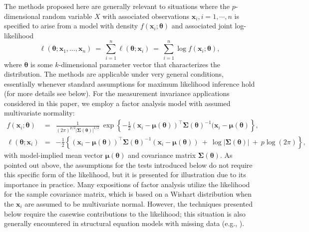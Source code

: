 \documentclass[man]{apa}
\begin{document}
The methods proposed here are generally relevant to situations where the
$p$-dimensional random variable $X$ with associated observations $\bm{x}_i, i=1,\cdots,n$
is specified to arise from a model with density $f(\bm{x}_i; \bm{\theta})$ and
associated joint log-likelihood
\begin{equation} \label{eq:loglik}
  \ell(\bm{\theta}; \bm{x}_1, \dots, \bm{x}_n) ~=~
    \sum_{i = 1}^n \ell(\bm{\theta}; \bm{x}_i) ~=~
    \sum_{i = 1}^n  \log f(\bm{x}_i; \bm{\theta}),
\end{equation}
where ${\bm \theta}$ is some $k$-dimensional parameter vector that characterizes
the distribution. 
The methods are applicable under very general conditions, essentially
whenever standard assumptions for maximum likelihood inference hold (for more
details see below). For the measurement invariance applications
considered in this paper, we employ
a factor analysis model with assumed multivariate normality:
\begin{eqnarray}
    \label{eq:mvndensity}
    f(\bm{x}_i; \bm{\theta}) & = & \frac{1}{(2\pi)^{p/2} |
      \bm{\Sigma}(\bm{\theta}) |^{1/2}} ~ \exp \left\{ -\frac{1}{2}(\bm{x}_i -
    \bm{\mu}(\bm{\theta}))^{\top} \bm{\Sigma}(\bm{\theta})^{-1} (\bm{x}_i -
    \bm{\mu}(\bm{\theta}) \right\}, \\
    \label{eq:caselik}
    \ell(\bm{\theta}; \bm{x}_i) & = & -\frac{1}{2} \left\{
      (\bm{x}_i - \bm{\mu}(\bm{\theta}))^{\top} \bm{\Sigma}(\bm{\theta})^{-1} (\bm{x}_i - \bm{\mu}(\bm{\theta}))
      ~+~ \log | \bm{\Sigma}(\bm{\theta}) | ~+~ p \log(2 \pi) \right\},
\end{eqnarray}
with model-implied mean vector ${\bm{\mu}}({\bm{\theta}})$ and
covariance matrix ${\bm{\Sigma}}({\bm{\theta}})$. As pointed out above,
the assumptions for the tests introduced below do not require this specific
form of the likelihood, but it is presented for illustration due to
its importance in practice.  Many expositions of factor analysis
utilize the likelihood for the sample covariance matrix, which is
based on a Wishart distribution when the $\bm{x}_i$ are assumed to be
multivariate normal.
However, the techniques presented below require the casewise contributions
to the likelihood; this situation is also generally
encountered in structural equation models with missing data (e.g.,
).
\end{document}
